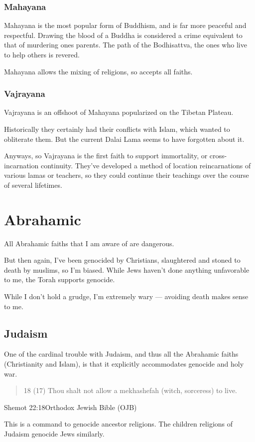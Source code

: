 \subsection{Mahayana}
Mahayana is the most popular form of Buddhism, and is far more peaceful and
respectful. Drawing the blood of a Buddha is considered a crime equivalent to
that of murdering ones parents.  The path of the Bodhisattva, the ones who live 
to help others is revered.  

Mahayana allows the mixing of religions, so accepts all faiths. 

\subsection{Vajrayana}
Vajrayana is an offshoot of Mahayana popularized on the Tibetan Plateau. 

Historically they certainly had their conflicts with Islam, which wanted to
obliterate them.  But the current Dalai Lama seems to have forgotten about it. 

Anyways, so Vajrayana is the first faith to support immortality,  or
cross-incarnation continuity.  They've developed a method of location
reincarnations of various lamas or teachers, so they could continue their
teachings over the course of several lifetimes. 

\chapter{Abrahamic}
All Abrahamic faiths that I am aware of are dangerous.

But then again, I've been genocided by Christians, slaughtered and 
stoned to death by muslims, so I'm biased. While Jews haven't done anything
unfavorable to me, the Torah supports genocide.

While I don't hold a grudge, I'm extremely wary --- avoiding death makes sense to
me. 


\section{Judaism}
One of the cardinal trouble with Judaism, and thus all the Abrahamic faiths
(Christianity and Islam), is that
it explicitly accommodates genocide and holy war. 

\blockquote{18 (17) Thou shalt not allow a mekhashefah (witch, sorceress) to
live.}{Shemot 22:18Orthodox Jewish Bible (OJB)}

This is a command to genocide ancestor religions.
The children religions of Judaism genocide Jews similarly.

